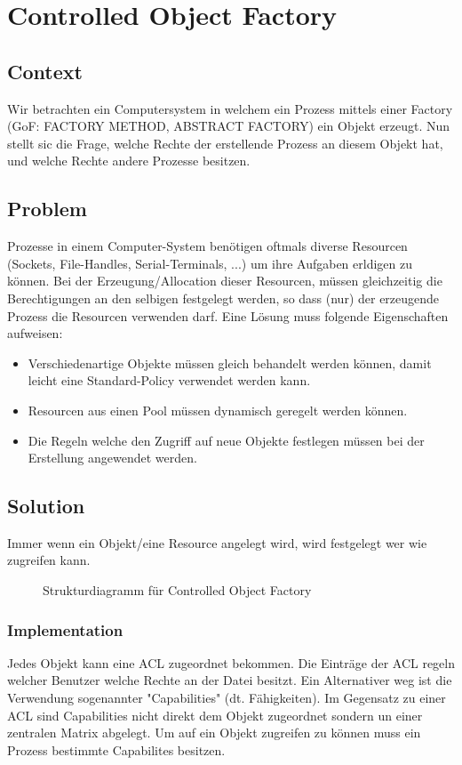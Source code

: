 \chapter{Controlled Object Factory}

\section{Context}
Wir betrachten ein Computersystem in welchem ein Prozess mittels einer Factory (GoF: FACTORY METHOD, ABSTRACT FACTORY) ein Objekt erzeugt. Nun stellt sic die Frage, welche Rechte der erstellende Prozess an diesem Objekt hat, und welche Rechte andere Prozesse besitzen.

\section{Problem}
Prozesse in einem Computer-System benötigen oftmals diverse Resourcen (Sockets, File-Handles, Serial-Terminals, ...) um ihre Aufgaben erldigen zu können. Bei der Erzeugung/Allocation dieser Resourcen, müssen gleichzeitig die Berechtigungen an den selbigen festgelegt werden, so dass (nur) der erzeugende Prozess die Resourcen verwenden darf. Eine Lösung muss folgende Eigenschaften aufweisen:
\begin{itemize}
  \item Verschiedenartige Objekte müssen gleich behandelt werden können, damit leicht eine Standard-Policy verwendet werden kann.
  \item Resourcen aus einen Pool müssen dynamisch geregelt werden können.
  \item Die Regeln welche den Zugriff auf neue Objekte festlegen müssen bei der Erstellung angewendet werden.
\end{itemize}

\section{Solution}
Immer wenn ein Objekt/eine Resource angelegt wird, wird festgelegt wer wie zugreifen kann.

\begin{figure}[H]
  \centering
  
  \caption{Strukturdiagramm f\"ur Controlled Object Factory}
\end{figure}

\subsection{Implementation}
Jedes Objekt kann eine ACL zugeordnet bekommen. Die Einträge der ACL regeln welcher Benutzer welche Rechte an der Datei besitzt.
Ein Alternativer weg ist die Verwendung sogenannter "Capabilities" (dt. Fähigkeiten). Im Gegensatz zu einer ACL sind Capabilities nicht direkt dem Objekt zugeordnet sondern un einer zentralen Matrix abgelegt. Um auf ein Objekt zugreifen zu können muss ein Prozess bestimmte Capabilites besitzen.

